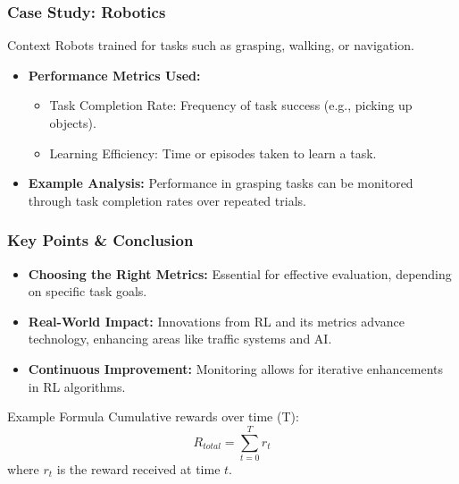 \documentclass[aspectratio=169]{beamer}
\begin{document}
\begin{frame}[fragile]
    \frametitle{Case Study: Robotics}
    \begin{block}{Context}
        Robots trained for tasks such as grasping, walking, or navigation.
    \end{block}
    \begin{itemize}
        \item \textbf{Performance Metrics Used:}
        \begin{itemize}
            \item Task Completion Rate: Frequency of task success (e.g., picking up objects).
            \item Learning Efficiency: Time or episodes taken to learn a task.
        \end{itemize}
        \item \textbf{Example Analysis:} 
        Performance in grasping tasks can be monitored through task completion rates over repeated trials.
    \end{itemize}
\end{frame}

\begin{frame}[fragile]
    \frametitle{Key Points & Conclusion}
    \begin{itemize}
        \item \textbf{Choosing the Right Metrics:} Essential for effective evaluation, depending on specific task goals.
        \item \textbf{Real-World Impact:} Innovations from RL and its metrics advance technology, enhancing areas like traffic systems and AI.
        \item \textbf{Continuous Improvement:} Monitoring allows for iterative enhancements in RL algorithms.
    \end{itemize}
    \begin{block}{Example Formula}
        Cumulative rewards over time (T):
        \[
        R_{total} = \sum_{t=0}^{T} r_t
        \]
        where \( r_t \) is the reward received at time \( t \).
    \end{block}
\end{frame}
\end{document}
